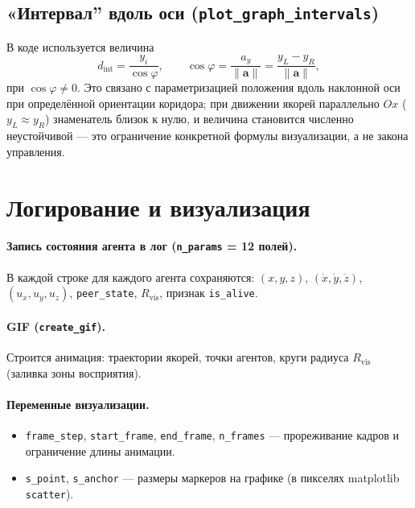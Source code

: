 \documentclass[12pt,a4paper]{article}
\begin{document}
\subsection{«Интервал'' вдоль оси (\texttt{plot\_graph\_intervals})}

В коде используется величина
\begin{equation}
  d_{\mathrm{int}} = \frac{y_i}{\cos\varphi},\qquad
  \cos\varphi = \frac{a_y}{\|\mathbf{a}\|} = \frac{y_L - y_R}{\|\mathbf{a}\|},
\end{equation}
при $\cos\varphi \neq 0$. Это связано с параметризацией положения вдоль наклонной оси при определённой ориентации коридора; при движении якорей параллельно $Ox$ ($y_L \approx y_R$) знаменатель близок к нулю, и величина становится численно неустойчивой --- это ограничение конкретной формулы визуализации, а не закона управления.

\section{Логирование и визуализация}

\paragraph{Запись состояния агента в лог (\texttt{n\_params} = 12 полей).}
В каждой строке для каждого агента сохраняются: $(x,y,z)$, $(\dot x,\dot y,\dot z)$, $(u_x,u_y,u_z)$, \texttt{peer\_state}, $R_{\mathrm{vis}}$, признак \texttt{is\_alive}.

\paragraph{GIF (\texttt{create\_gif}).}
Строится анимация: траектории якорей, точки агентов, круги радиуса $R_{\mathrm{vis}}$ (заливка зоны восприятия).

\paragraph{Переменные визуализации.}
\begin{itemize}
  \item \texttt{frame\_step}, \texttt{start\_frame}, \texttt{end\_frame}, \texttt{n\_frames} --- прореживание кадров и ограничение длины анимации.
  \item \texttt{s\_point}, \texttt{s\_anchor} --- размеры маркеров на графике (в пикселях matplotlib \texttt{scatter}).
\end{itemize}
\end{document}
